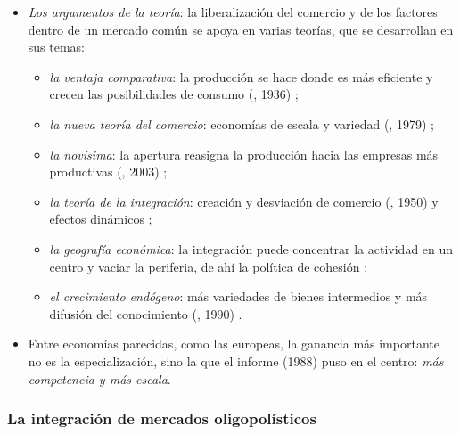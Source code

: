 \documentclass[11pt]{article}
\begin{document}
\begin{itemize}
\item \emph{Los argumentos de la teoría}: la liberalización del comercio y de los factores dentro de un mercado común se apoya en varias teorías, que se desarrollan en sus temas:
  \begin{itemize}
  \item \emph{la ventaja comparativa}: la producción se hace donde es más eficiente y crecen las posibilidades de consumo (, 1936) ;
  \item \emph{la nueva teoría del comercio}: economías de escala y variedad (, 1979) ;
  \item \emph{la novísima}: la apertura reasigna la producción hacia las empresas más productivas (, 2003) ;
  \item \emph{la teoría de la integración}: creación y desviación de comercio (, 1950) y efectos dinámicos ;
  \item \emph{la geografía económica}: la integración puede concentrar la actividad en un centro y vaciar la periferia, de ahí la política de cohesión  ;
  \item \emph{el crecimiento endógeno}: más variedades de bienes intermedios y más difusión del conocimiento (, 1990) .
  \end{itemize}
\item Entre economías parecidas, como las europeas, la ganancia más importante no es la especialización, sino la que el informe  (1988) puso en el centro: \emph{más competencia y más escala}.
\end{itemize}

\subsubsection{La integración de mercados oligopolísticos}\label{sec:modelo-integracion}
\end{document}
